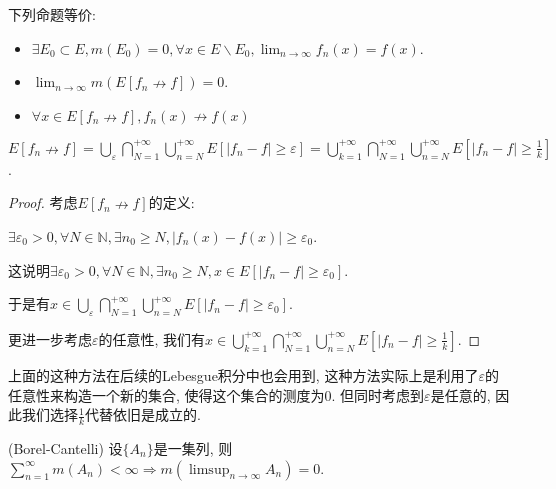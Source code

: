 \documentclass[theorem=false,mathfont=none,openany,sub3section]{easybook}
\begin{document}
\begin{theorem}
  下列命题等价:\par
  \begin{itemize}
    \item $\exists E_0\subset E, m(E_0) = 0, \forall x\in E\backslash E_0, \lim_{n \to \infty}f_n(x)=f(x)$.
    \item $\lim_{n\to \infty}m(E[f_n \nrightarrow f])=0$.
    \item $\forall x\in E[f_n \nrightarrow f], f_n(x)\nrightarrow f(x)$
  \end{itemize}
\end{theorem}

\begin{lemma}
  $E[f_n \nrightarrow f] = \bigcup_{\varepsilon} \bigcap_{N=1}^{+\infty} \bigcup_{n=N}^{+\infty}E\left[\left|f_n-f\right|\geqslant \varepsilon\right] = \bigcup_{k=1}^{+\infty} \bigcap_{N=1}^{+\infty} \bigcup_{n=N}^{+\infty}E\left[\left|f_n-f\right|\geqslant \frac{1}{k}\right]$.
\end{lemma}

\begin{proof}
  考虑$E[f_n \nrightarrow f]$的定义:\par
  $\exists \varepsilon_0>0, \forall N\in \mathbb{N}, \exists n_0\geqslant N, \left|f_n(x)-f(x)\right|\geqslant \varepsilon_0$.\par
  这说明$\exists \varepsilon_0>0, \forall N\in \mathbb{N}, \exists n_0\geqslant N, x\in E\left[\left|f_n-f\right|\geqslant \varepsilon_0\right]$.\par
  于是有$x\in \bigcup_{\varepsilon} \bigcap_{N=1}^{+\infty} \bigcup_{n=N}^{+\infty}E\left[\left|f_n-f\right|\geqslant \varepsilon_0\right]$.\par
  更进一步考虑$\varepsilon$的任意性, 我们有$x \in \bigcup_{k=1}^{+\infty} \bigcap_{N=1}^{+\infty} \bigcup_{n=N}^{+\infty}E\left[\left|f_n-f\right|\geqslant \frac{1}{k}\right]$.\par
\end{proof}

\begin{remark}
  上面的这种方法在后续的Lebesgue积分中也会用到, 这种方法实际上是利用了$\varepsilon$的任意性来构造一个新的集合, 使得这个集合的测度为0. 但同时考虑到$\varepsilon$是任意的, 因此我们选择$\frac{1}{k}$代替依旧是成立的.\par
\end{remark}

\begin{lemma}
  (Borel-Cantelli) 设$\{A_n\}$是一集列, 则$\sum_{n=1}^{\infty}m(A_n)<\infty \Rightarrow m(\limsup_{n \to \infty}A_n)=0$.
\end{lemma}
\end{document}
